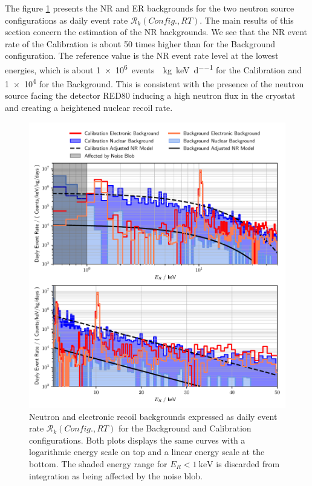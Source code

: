 The figure \ref{fig:background-measurements} presents the NR and ER backgrounds for the two neutron source configurations as daily event rate $\mathcal{R}_k(Config., RT)$. The main results of this section concern the estimation of the NR backgrounds. We see that the NR event rate of the Calibration is about 50 times higher than for the Background configuration. The reference value is the NR event rate level at the lowest energies, which is about \SI{1e6}{events \per \kg \per \kilo\eV \per \day} for the Calibration and \num{1e4} for the Background. This is consistent with the presence of the neutron source facing the detector RED80 inducing a high neutron flux in the cryostat and creating a heightened nuclear recoil rate. 

\begin{figure}
\centering
\includegraphics[scale=1]{Figures/Neutron/neutron_background.pdf}
\caption{Neutron and electronic recoil backgrounds expressed as daily event rate $\mathcal{R}_k(Config., RT)$ for the Background and Calibration configurations. Both plots displays the same curves with a logarithmic energy scale on top and a linear energy scale at the bottom. The shaded energy range for $E_R< \SI{1}{\kilo\eV}$ is discarded from integration as being affected by the noise blob.}
\label{fig:background-measurements}
\end{figure}

